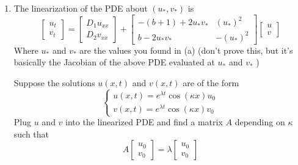 \documentclass[12pt]{article}
\begin{document}
\begin{enumerate}
    \item  The linearization of the PDE about $(u_*, v_*)$ is
    \[\begin{bmatrix}
        u_t\\v_t
    \end{bmatrix} = \begin{bmatrix}
        D_1u_{xx}\\D_2v_{xx}
    \end{bmatrix} + \begin{bmatrix}
        -(b + 1)+2u_* v_* & (u_*)^2\\
        b - 2u_* v_* & -(u_*)^2
    \end{bmatrix} \begin{bmatrix}
        u\\v
    \end{bmatrix}\]
    Where $u_*$ and $v_*$ are the values you found in (a)
    (don't prove this, but it's basically the Jacobian of the above PDE evaluated at $u_*$ and $v_*$ )
    
    Suppose the solutions $u(x, t)$ and $v(x, t)$ are of the form
    \[\begin{cases}
        u(x, t) = e^{\lambda t}\cos(\kappa x)u_0\\
        v(x, t) = e^{\lambda t}\cos(\kappa x)v_0
    \end{cases}\]
    Plug $u$ and $v$ into the linearized PDE and find a matrix $A$ depending on $\kappa$ such that
    \[A \begin{bmatrix}
        u_0\\v_0
    \end{bmatrix} = \lambda \begin{bmatrix}
        u_0\\v_0
    \end{bmatrix}\]


\end{enumerate}
\end{document}

